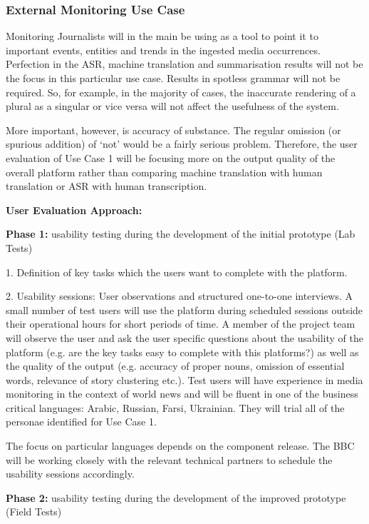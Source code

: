 \subsubsection{External Monitoring Use Case}
Monitoring Journalists will in the main be using \SUMMA as a tool to point it to important events, entities and trends in the ingested media occurrences. Perfection in the ASR, machine translation and summarisation results will not be the focus in this particular use case. Results in spotless grammar will not be required. So, for example, in the majority of cases, the inaccurate rendering of a plural as a singular or vice versa will not affect the usefulness of the system. 

More important, however, is accuracy of substance. The regular omission (or spurious addition) of ‘not’ would be a fairly serious problem. Therefore, the user evaluation of Use Case 1 will be focusing more on the output quality of the overall platform rather than comparing machine translation with human translation or ASR with human transcription.
\medskip

\textbf{User Evaluation Approach:} 

\textbf{Phase 1:} usability testing during the development of the initial prototype (Lab Tests)

1. Definition of key tasks which the users want to complete with the \SUMMA platform. 

2. Usability sessions: User observations and structured one-to-one interviews. A small number of test users will use the platform during scheduled sessions outside their operational hours for short periods of time. A member of the project team will observe the user and ask the user specific questions about the usability of the platform (e.g. are the key tasks easy to complete with this platforms?) as well as the quality of the output (e.g. accuracy of proper nouns, omission of essential words, relevance of story clustering etc.). Test users will have experience in media monitoring in the context of world news and will be fluent in one of the business critical languages: Arabic, Russian, Farsi, Ukrainian. They will trial all of the personae identified for Use Case 1. 
\medskip

The focus on particular languages depends on the component release. The BBC will be working closely with the relevant technical partners to schedule the usability sessions accordingly.
\medskip

\textbf{Phase 2:} usability testing during the development of the improved prototype (Field Tests)
\smallskip

